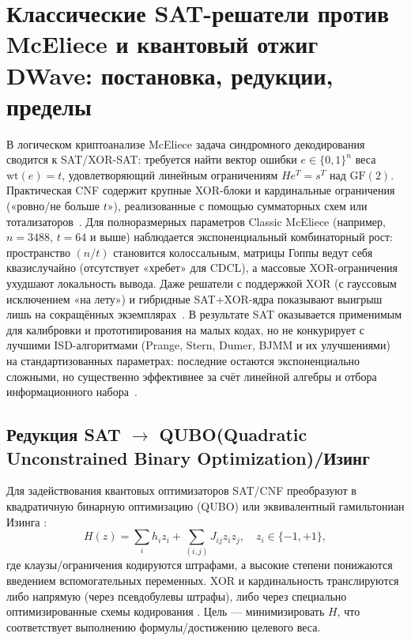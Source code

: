 
\section{Классические SAT-решатели против McEliece и квантовый отжиг DWave: постановка, редукции, пределы}



В логическом криптоанализе McEliece задача синдромного декодирования сводится к SAT/XOR-SAT: требуется найти вектор ошибки $e \in \{0,1\}^{n}$ веса $\mathrm{wt}(e)=t$, удовлетворяющий линейным ограничениям $He^{T}=s^{T}$ над $\mathrm{GF}(2)$. Практическая CNF содержит крупные XOR-блоки и кардинальные ограничения («ровно/не больше $t$»), реализованные с помощью сумматорных схем или тотализаторов~\cite{Zhang2000,Mironov2006,Lafitte2014}. Для полноразмерных параметров Classic McEliece (например, $n=3488$, $t=64$ и выше) наблюдается экспоненциальный комбинаторный рост: пространство $(n/t)$ становится колоссальным, матрицы Гоппы ведут себя квазислучайно (отсутствует «хребет» для CDCL), а массовые XOR-ограничения ухудшают локальность вывода. Даже решатели с поддержкой XOR (с гауссовым исключением «на лету») и гибридные SAT+XOR-ядра показывают выигрыш лишь на сокращённых экземплярах~\cite{Im2025}. В результате SAT оказывается применимым для калибровки и прототипирования на малых кодах, но не конкурирует с лучшими ISD-алгоритмами (Prange, Stern, Dumer, BJMM и их улучшениями) на стандартизованных параметрах: последние остаются экспоненциально сложными, но существенно эффективнее за счёт линейной алгебры и отбора информационного набора~\cite{Shintaro2024,ClassicMcEliece2020}.


\subsection*{Редукция SAT $\rightarrow$ QUBO(Quadratic Unconstrained Binary Optimization)/Изинг}
Для задействования квантовых оптимизаторов SAT/CNF преобразуют в квадратичную бинарную оптимизацию (QUBO) или эквивалентный гамильтониан Изинга \cite{Bian2018,Sirdey2023}:
$$
H(z)=\sum_i h_i z_i + \sum_{(i,j)} J_{ij}z_i z_j, \quad z_i \in\{-1,+1\},
$$
где клаузы/ограничения кодируются штрафами, а высокие степени понижаются введением вспомогательных переменных. XOR и кардинальность транслируются либо напрямую (через псевдобулевы штрафы), либо через специально оптимизированные схемы кодирования \cite{Pei2025}. Цель --- минимизировать $H$, что соответствует выполнению формулы/достижению целевого веса.

